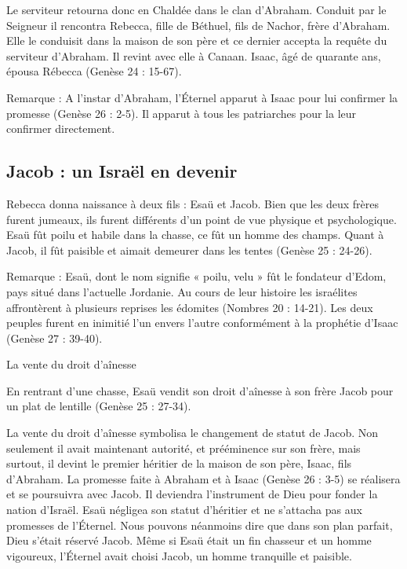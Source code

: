 Le serviteur retourna donc en Chaldée dans le clan d'Abraham. Conduit par le Seigneur il rencontra Rebecca, fille de Béthuel, fils de Nachor, frère d'Abraham. Elle le conduisit dans la maison de son père et ce dernier accepta la requête du serviteur d'Abraham. Il revint avec elle à Canaan. Isaac, âgé de quarante ans, épousa Rébecca (Genèse 24 : 15-67).

Remarque : A l'instar d'Abraham, l’Éternel apparut à Isaac pour lui confirmer la promesse (Genèse 26 : 2-5). Il apparut à tous les patriarches pour la leur confirmer directement.

\subsection*{Jacob : un Israël en devenir}

Rebecca donna naissance à deux fils : Esaü et Jacob. Bien que les deux frères furent jumeaux, ils furent différents d'un point de vue physique et psychologique. Esaü fût poilu et habile dans la chasse, ce fût un homme des champs. Quant à Jacob, il fût paisible et aimait demeurer dans les tentes (Genèse 25 : 24-26).

Remarque : Esaü, dont le nom signifie « poilu, velu » fût le fondateur d'Edom, pays situé dans l'actuelle Jordanie. Au cours de leur histoire les israélites affrontèrent à plusieurs reprises les édomites (Nombres 20 : 14-21). Les deux peuples furent en inimitié l'un envers l'autre conformément à la prophétie d'Isaac (Genèse 27 : 39-40).

La vente du droit d’aînesse

En rentrant d'une chasse, Esaü vendit son droit d'aînesse à son frère Jacob pour un plat de lentille (Genèse 25 : 27-34).

La vente du droit d’aînesse symbolisa le changement de statut de Jacob. Non seulement il avait maintenant autorité, et prééminence sur son frère, mais surtout, il devint le premier héritier de la maison de son père, Isaac, fils d'Abraham. La promesse faite à Abraham et à Isaac (Genèse 26 : 3-5) se réalisera et se poursuivra avec Jacob. Il deviendra l’instrument de Dieu pour fonder la nation d’Israël. Esaü négligea son statut d'héritier et ne s'attacha pas aux promesses de l’Éternel. Nous pouvons néanmoins dire que dans son plan parfait, Dieu s'était réservé Jacob. Même si Esaü était un fin chasseur et un homme vigoureux, l’Éternel avait choisi Jacob, un homme tranquille et paisible.


